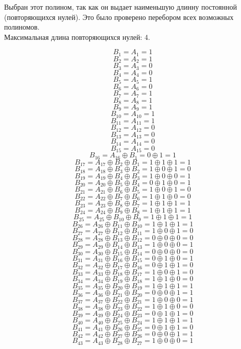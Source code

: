 \documentclass[12pt,onecolumn]{article}
\begin{document}
Выбран этот полином, так как он выдает наименьшую длинну постоянной (повторяющихся нулей). Это было проверено перебором всех возможных полиномов.\\
Максимальная длина повторяющихся нулей: 4.

$$B_{1} = A_{1}= 1$$
$$B_{2} = A_{2}= 1$$
$$B_{3} = A_{3}= 0$$
$$B_{4} = A_{4}= 0$$
$$B_{5} = A_{5}= 1$$
$$B_{6} = A_{6}= 0$$
$$B_{7} = A_{7}= 1$$
$$B_{8} = A_{8}= 1$$
$$B_{9} = A_{9}= 1$$
$$B_{10} = A_{10}= 1$$
$$B_{11} = A_{11}= 1$$
$$B_{12} = A_{12}= 0$$
$$B_{13} = A_{13}= 0$$
$$B_{14} = A_{14}= 0$$
$$B_{15} = A_{15}= 0$$
$$B_{16} = A_{16} \oplus B_{1} = 0 \oplus 1 = 1$$
$$B_{17} = A_{17} \oplus B_{2} \oplus B_{1} = 1 \oplus 1 \oplus 1 = 1$$
$$B_{18} = A_{18} \oplus B_{3} \oplus B_{2} = 1 \oplus 0 \oplus 1 = 0$$
$$B_{19} = A_{19} \oplus B_{4} \oplus B_{3} = 1 \oplus 0 \oplus 0 = 1$$
$$B_{20} = A_{20} \oplus B_{5} \oplus B_{4} = 0 \oplus 1 \oplus 0 = 1$$
$$B_{21} = A_{21} \oplus B_{6} \oplus B_{5} = 1 \oplus 0 \oplus 1 = 0$$
$$B_{22} = A_{22} \oplus B_{7} \oplus B_{6} = 1 \oplus 1 \oplus 0 = 0$$
$$B_{23} = A_{23} \oplus B_{8} \oplus B_{7} = 1 \oplus 1 \oplus 1 = 1$$
$$B_{24} = A_{24} \oplus B_{9} \oplus B_{8} = 1 \oplus 1 \oplus 1 = 1$$
$$B_{25} = A_{25} \oplus B_{10} \oplus B_{9} = 1 \oplus 1 \oplus 1 = 1$$
$$B_{26} = A_{26} \oplus B_{11} \oplus B_{10} = 1 \oplus 1 \oplus 1 = 1$$
$$B_{27} = A_{27} \oplus B_{12} \oplus B_{11} = 1 \oplus 0 \oplus 1 = 0$$
$$B_{28} = A_{28} \oplus B_{13} \oplus B_{12} = 0 \oplus 0 \oplus 0 = 0$$
$$B_{29} = A_{29} \oplus B_{14} \oplus B_{13} = 1 \oplus 0 \oplus 0 = 1$$
$$B_{30} = A_{30} \oplus B_{15} \oplus B_{14} = 0 \oplus 0 \oplus 0 = 0$$
$$B_{31} = A_{31} \oplus B_{16} \oplus B_{15} = 0 \oplus 1 \oplus 0 = 1$$
$$B_{32} = A_{32} \oplus B_{17} \oplus B_{16} = 0 \oplus 1 \oplus 1 = 0$$
$$B_{33} = A_{33} \oplus B_{18} \oplus B_{17} = 1 \oplus 0 \oplus 1 = 0$$
$$B_{34} = A_{34} \oplus B_{19} \oplus B_{18} = 1 \oplus 1 \oplus 0 = 0$$
$$B_{35} = A_{35} \oplus B_{20} \oplus B_{19} = 1 \oplus 1 \oplus 1 = 1$$
$$B_{36} = A_{36} \oplus B_{21} \oplus B_{20} = 0 \oplus 0 \oplus 1 = 1$$
$$B_{37} = A_{37} \oplus B_{22} \oplus B_{21} = 1 \oplus 0 \oplus 0 = 1$$
$$B_{38} = A_{38} \oplus B_{23} \oplus B_{22} = 1 \oplus 1 \oplus 0 = 0$$
$$B_{39} = A_{39} \oplus B_{24} \oplus B_{23} = 0 \oplus 1 \oplus 1 = 0$$
$$B_{40} = A_{40} \oplus B_{25} \oplus B_{24} = 1 \oplus 1 \oplus 1 = 1$$
$$B_{41} = A_{41} \oplus B_{26} \oplus B_{25} = 0 \oplus 1 \oplus 1 = 0$$
$$B_{42} = A_{42} \oplus B_{27} \oplus B_{26} = 0 \oplus 0 \oplus 1 = 1$$
$$B_{43} = A_{43} \oplus B_{28} \oplus B_{27} = 1 \oplus 0 \oplus 0 = 1$$
\end{document}
